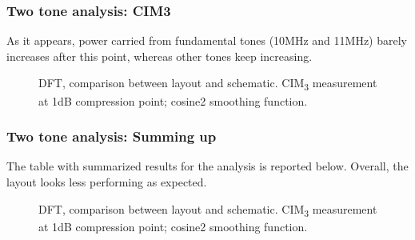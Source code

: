 \begin{frame}
\frametitle{Two tone analysis: CIM3}
As it appears, power carried from fundamental tones (10MHz and 11MHz) barely increases after this point, whereas other tones keep increasing. 
\begin{figure}[H] 
	\centering
	\caption{DFT, comparison between layout and schematic. CIM\textsubscript{3} measurement at 1dB compression point; cosine2 smoothing function. }
	\label{fig:DFT_2ton_zoom}
\end{figure}
\end{frame}

\begin{frame}
\frametitle{Two tone analysis: Summing up}
The table with summarized results for the analysis is reported below. Overall, the layout looks less performing as expected. 
\begin{figure}[H] 
	\centering
	\caption{DFT, comparison between layout and schematic. CIM\textsubscript{3} measurement at 1dB compression point; cosine2 smoothing function. }
	\label{fig:DFT_2ton_zoom}
\end{figure}
\end{frame}